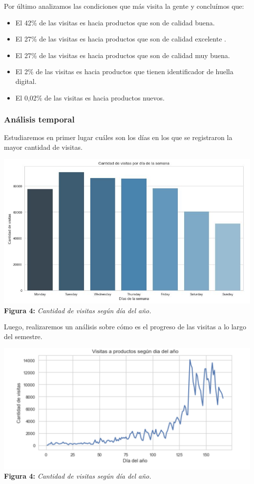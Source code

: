 \documentclass[titlepage,a4paper]{article}
\begin{document}
	Por último analizamos las condiciones que más visita la gente y concluímos que:
	\begin{itemize}
    \item El 42\% de las visitas es hacia productos que son de calidad buena.
    \item El 27\% de las visitas es hacia productos que son de calidad excelente .
    \item El 27\% de las visitas es hacia productos que son de calidad muy buena.
        \item El 2\% de las visitas es hacia  productos que tienen identificador de huella digital. 
        	\item El 0,02\%  de las visitas es hacia  productos nuevos.    
	\end{itemize}
	\subsubsection{Análisis temporal}
	Estudiaremos en primer lugar cuáles son los días en los que se registraron la mayor cantidad de visitas.
	
		\begin{center}
	\includegraphics[width=15cm]{cantidadDeVisitasPorDiaDeLaSemana.jpg}\\
	\textbf{Figura 4:}  \textit{Cantidad de visitas según día del año.  }
	\end{center}
	
	Luego, realizaremos un análisis sobre cómo es el progreso de las visitas a lo largo del semestre.
	\begin{center}
	\includegraphics[width=15cm]{VisitasAProductosSegunDiaAnio.jpg}\\
	\textbf{Figura 4:}  \textit{Cantidad de visitas según día del año.  }
	\end{center}
\end{document}
